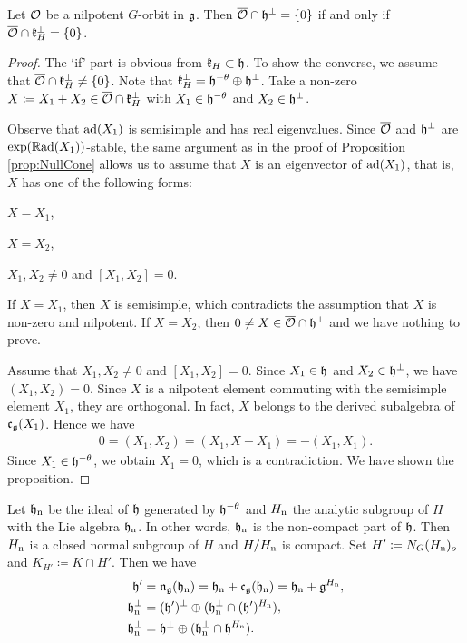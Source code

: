 \begin{proposition} \label{prop:AdmissibilityCriterionWavefront}
	Let $\mathcal{O}$ be a nilpotent $G$-orbit in $\mathfrak{g}$.
	Then $\overline{\mathcal{O}} \cap \mathfrak{h}^\perp = \left\{0 \right\}$ if and only if $\overline{\mathcal{O}} \cap \mathfrak{k}_H^\perp = \left\{0 \right\}$.
\end{proposition}

\begin{proof}
	The `if' part is obvious from $\mathfrak{k}_H \subset \mathfrak{h}$.
	To show the converse, we assume that $\overline{\mathcal{O}} \cap \mathfrak{k}_H^\perp \neq \left\{0 \right\}$.
	Note that $\mathfrak{k}_H^\perp = \mathfrak{h}^{-\theta} \oplus \mathfrak{h}^\perp$.
	Take a non-zero $X\coloneq X_1 + X_2 \in \overline{\mathcal{O}} \cap \mathfrak{k}_H^\perp$ with $X_1 \in \mathfrak{h}^{-\theta}$ and $X_2 \in \mathfrak{h}^\perp$.
	
	Observe that $\mathrm{ad}(X_1)$ is semisimple and has real eigenvalues.
	Since $\overline{\mathcal{O}}$ and $\mathfrak{h}^\perp$ are $\exp(\mathbb{R} \mathrm{ad}(X_1))$-stable, the same argument as in the proof of Proposition \ref{prop:NullCone} allows us to assume that $X$ is an eigenvector of $\mathrm{ad}(X_1)$, that is, $X$ has one of the following forms:
	\begin{enumparen}
		\item $X = X_1$,
		\item $X = X_2$,
		\item $X_1, X_2 \neq 0$ and $[X_1, X_2] = 0$.
	\end{enumparen}
	If $X = X_1$, then $X$ is semisimple, which contradicts the assumption that $X$ is non-zero and nilpotent.
	If $X = X_2$, then $0 \neq X \in \overline{\mathcal{O}} \cap \mathfrak{h}^\perp$ and we have nothing to prove.

	Assume that $X_1, X_2 \neq 0$ and $[X_1, X_2] = 0$.
	Since $X_1 \in \mathfrak{h}$ and $X_2 \in \mathfrak{h}^\perp$, we have $(X_1, X_2) = 0$.
	Since $X$ is a nilpotent element commuting with the semisimple element $X_1$, they are orthogonal.
	In fact, $X$ belongs to the derived subalgebra of $\mathfrak{c}_{\mathfrak{g}}(X_1)$.
	Hence we have
	\begin{align*}
		0 = (X_1, X_2) = (X_1, X - X_1) = -(X_1, X_1).
	\end{align*}
	Since $X_1 \in \mathfrak{h}^{-\theta}$, we obtain $X_1 = 0$, which is a contradiction.
	We have shown the proposition.
\end{proof}

Let $\mathfrak{h}_{\mathrm{n}}$ be the ideal of $\mathfrak{h}$ generated by $\mathfrak{h}^{-\theta}$ and $H_{\mathrm{n}}$ the analytic subgroup of $H$ with the Lie algebra $\mathfrak{h}_{\mathrm{n}}$.
In other words, $\mathfrak{h}_{\mathrm{n}}$ is the non-compact part of $\mathfrak{h}$.
Then $H_{\mathrm{n}}$ is a closed normal subgroup of $H$ and $H/H_{\mathrm{n}}$ is compact.
Set $H' \coloneq N_{G}(H_{\mathrm{n}})_o$ and $K_{H'} \coloneq K \cap H'$.
Then we have
\begin{align*}
	\mathfrak{h}' &= \mathfrak{n}_{\mathfrak{g}}(\mathfrak{h}_{\mathrm{n}}) = \mathfrak{h}_{\mathrm{n}} + \mathfrak{c}_{\mathfrak{g}}(\mathfrak{h}_{\mathrm{n}}) = \mathfrak{h}_{\mathrm{n}} + \mathfrak{g}^{H_{\mathrm{n}}}, \\
	\mathfrak{h}_{\mathrm{n}}^\perp &= (\mathfrak{h'})^\perp \oplus (\mathfrak{h}_{\mathrm{n}}^\perp \cap (\mathfrak{h}')^{H_{\mathrm{n}}}), \\
	\mathfrak{h}_{\mathrm{n}}^\perp &= \mathfrak{h}^\perp \oplus (\mathfrak{h}_{\mathrm{n}}^\perp \cap \mathfrak{h}^{H_{\mathrm{n}}}).
\end{align*}

